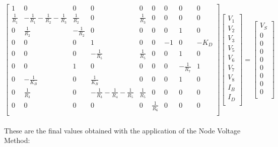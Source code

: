 \[
\begin{bmatrix}
1 & 0 & 0 & 0 & 0 & 0 & 0 & 0 & 0\\

\frac{1}{R_1} & -\frac{1}{R_1} -\frac{1}{R_2} -\frac{1}{R_3} & \frac{1}{R_2} & 0 & \frac{1}{R_3} & 0 & 0 & 0 & 0\\

0 & \frac{1}{R_2} & -\frac{1}{R_2} & 0 & 0 & 0 & 0 & 1 & 0\\

0 & 0 & 0 & 1 & 0 & 0 & -1 & 0 & -K_D\\

0 & 0 & 0 & -\frac{1}{R_5} & \frac{1}{R_5} & 0 & 0 & 1 & 0\\

0 & 0 & 1 & 0 & 0 & 0 & 0 & -\frac{1}{R_7} & 1\\

0 & -\frac{1}{K_B} & 0 & \frac{1}{K_B} & 0 & 0 & 0 & 1 & 0\\

0 & \frac{1}{R_3} & 0 & -\frac{1}{R_3}-\frac{1}{R_4}-\frac{1}{R_5} & \frac{1}{R_5} & 0 & 0 & 0 & 0\\

0 & 0 & 0 & 0 & 0 & \frac{1}{R_6} & 0 & 0 & 0\\
\end{bmatrix}
\begin{bmatrix}
V_1\\
V_2\\
V_3\\
V_5\\
V_6\\
V_7\\
V_8\\
I_B\\
I_D\\
\end{bmatrix}
=
\begin{bmatrix}
V_S\\
0\\
0\\
0\\
0\\
0\\
0\\
0\\
0\\
\end{bmatrix}
\]

\paragraph{}
These are the final values obtained with the application of the Node Voltage Method:

